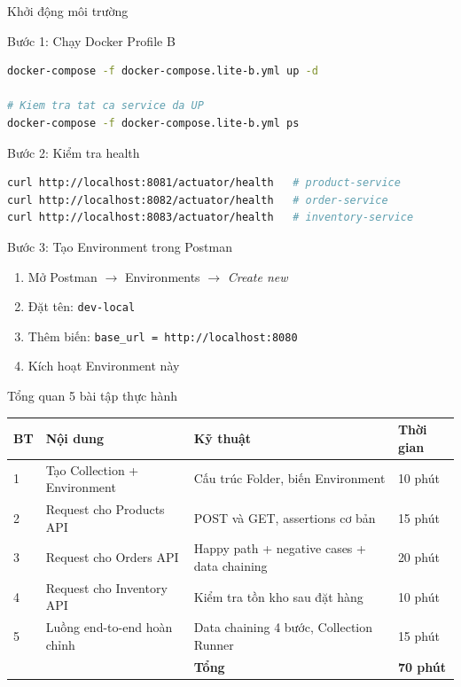 \documentclass[aspectratio=169,10pt]{beamer}
\begin{document}
\begin{frame}[fragile]{Khởi động môi trường}
  \begin{block}{Bước 1: Chạy Docker Profile B}
\begin{lstlisting}[language=bash,style=nonumber]
docker-compose -f docker-compose.lite-b.yml up -d

# Kiem tra tat ca service da UP
docker-compose -f docker-compose.lite-b.yml ps
\end{lstlisting}
  \end{block}

  \begin{block}{Bước 2: Kiểm tra health}
\begin{lstlisting}[language=bash,style=nonumber]
curl http://localhost:8081/actuator/health   # product-service
curl http://localhost:8082/actuator/health   # order-service
curl http://localhost:8083/actuator/health   # inventory-service
\end{lstlisting}
  \end{block}

  \begin{block}{Bước 3: Tạo Environment trong Postman}
    \begin{enumerate}
      \item Mở Postman $\to$ Environments $\to$ \textit{Create new}
      \item Đặt tên: \texttt{dev-local}
      \item Thêm biến: \texttt{base\_url = http://localhost:8080}
      \item Kích hoạt Environment này
    \end{enumerate}
  \end{block}
\end{frame}

\begin{frame}{Tổng quan 5 bài tập thực hành}
  \begin{center}
  \small
  \begin{tabular}{p{0.5cm}p{3.5cm}p{5cm}p{1.8cm}}
    \toprule
    \textbf{BT} & \textbf{Nội dung} & \textbf{Kỹ thuật} & \textbf{Thời gian} \\
    \midrule
    1 & Tạo Collection + Environment &
      Cấu trúc Folder, biến Environment &
      10 phút \\
    2 & Request cho Products API &
      POST và GET, assertions cơ bản &
      15 phút \\
    3 & Request cho Orders API &
      Happy path + negative cases + data chaining &
      20 phút \\
    4 & Request cho Inventory API &
      Kiểm tra tồn kho sau đặt hàng &
      10 phút \\
    5 & Luồng end-to-end hoàn chỉnh &
      Data chaining 4 bước, Collection Runner &
      15 phút \\
    \midrule
    & & \textbf{Tổng} & \textbf{70 phút} \\
    \bottomrule
  \end{tabular}
  \end{center}
\end{frame}
\end{document}
